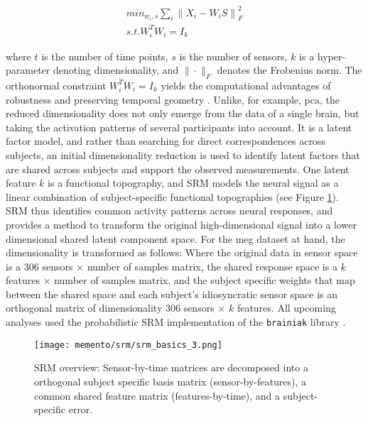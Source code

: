 \begin{equation}
	\begin{aligned}
		min_{w_i, s}\sum_i{\|X_i - W_iS \|}^2_F \\
		s.t. W^T_iW_i = I_k
	\end{aligned}
	\label{eq:srm}
\end{equation}

where $t$ is the number of time points, $s$ is the number of sensors, $k$ is a hyper-parameter denoting dimensionality, and $\|\cdot\|_F$ denotes the Frobenius norm.
The orthonormal constraint $W^T_iW_i = I_k$ yields the computational advantages of robustness and preserving temporal geometry \citep{NIPS2015_b3967a0e}.
Unlike, for example, \gls{pca}, the reduced dimensionality does not only emerge from the data of a single brain, but taking the activation patterns of several participants into account.
It is a latent factor model, and rather than searching for direct correspondences across subjects, an initial dimensionality reduction is used to identify latent factors that are shared across subjects and support the observed measurements.
One latent feature $k$ is a functional topography, and \gls{SRM} models the neural signal as a linear combination of subject-specific functional topographies (see Figure \ref{fig:srm-basics-multi}).\\
\gls{SRM} thus identifies common activity patterns across neural responses, and provides a method to transform the original high-dimensional signal into a lower dimensional shared latent component space.
For the \gls{meg} dataset at hand, the dimensionality is transformed as follows:
Where the original data in sensor space is a $306$ sensors $\times$ number of samples matrix, the shared response space is a $k$ features $\times$ number of samples matrix, and the subject specific weights that map between the shared space and each subject's idiosyncratic sensor space is an orthogonal matrix of dimensionality $306$ sensors $\times$ $k$ features.
All upcoming analyses used the probabilistic \gls{SRM} implementation of the \texttt{brainiak} library \citep{brainiak}.

\begin{figure}[H]
	\centering
	\texttt{[image: memento/srm/srm\_basics\_3.png]}
	\caption[SRM overview]{SRM overview: Sensor-by-time matrices are decomposed into a orthogonal subject specific basis matrix (sensor-by-features), a common shared feature matrix (features-by-time), and a subject-specific error.}
	\label{fig:srm-basics-multi}
\end{figure}



